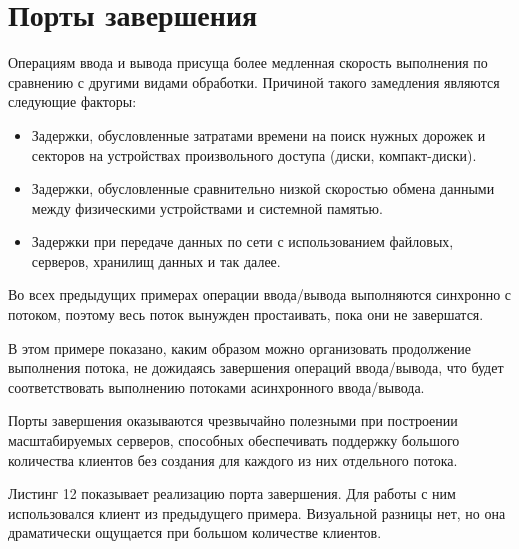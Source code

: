 \documentclass[a4paper,12pt]{article} %
\begin{document}
\section*{Порты завершения}

Операциям ввода и вывода присуща более медленная скорость выполнения по сравнению с другими видами обработки. Причиной такого замедления являются следующие факторы:

\begin{itemize}
\item Задержки, обусловленные затратами времени на поиск нужных дорожек и секторов на устройствах произвольного доступа (диски, компакт-диски).

\item Задержки, обусловленные сравнительно низкой скоростью обмена данными между физическими устройствами и системной памятью.

\item Задержки при передаче данных по сети с использованием файловых, серверов, хранилищ данных и так далее.
\end{itemize}

Во всех предыдущих примерах операции ввода/вывода выполняются синхронно с потоком, поэтому весь поток вынужден простаивать, пока они не завершатся.

В этом примере показано, каким образом можно организовать продолжение выполнения потока, не дожидаясь завершения операций ввода/вывода, что будет соответствовать выполнению потоками асинхронного ввода/вывода.

Порты завершения оказываются чрезвычайно полезными при построении масштабируемых серверов, способных обеспечивать поддержку большого количества клиентов без создания для каждого из них отдельного потока. 

Листинг 12 показывает реализацию порта завершения. Для работы с ним использовался клиент из предыдущего примера. Визуальной разницы нет, но она драматически ощущается при большом количестве клиентов.
\end{document}
